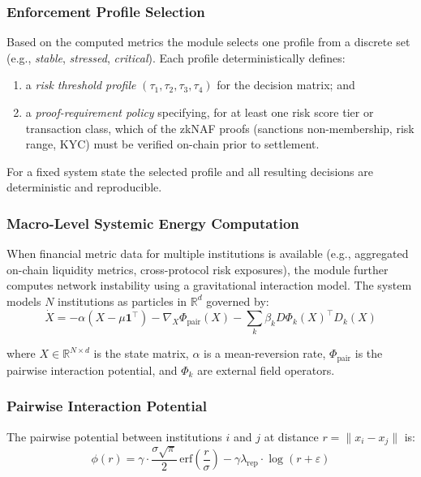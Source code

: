\documentclass[12pt,a4paper]{article}
\begin{document}
\subsubsection{Enforcement Profile Selection}

Based on the computed metrics the module selects one profile from a discrete
set (e.g., \textit{stable}, \textit{stressed}, \textit{critical}). Each
profile deterministically defines:
\begin{enumerate}[label=(\alph*)]
\item a \emph{risk threshold profile} $(\tau_1,\tau_2,\tau_3,\tau_4)$ for
the decision matrix; and
\item a \emph{proof-requirement policy} specifying, for at least one risk
score tier or transaction class, which of the zkNAF proofs (sanctions
non-membership, risk range, KYC) must be verified on-chain prior to
settlement.
\end{enumerate}

For a fixed system state the selected profile and all resulting decisions are
deterministic and reproducible.

\subsubsection{Macro-Level Systemic Energy Computation}

When financial metric data for multiple institutions is available (e.g.,
aggregated on-chain liquidity metrics, cross-protocol risk exposures), the
module further computes network instability using a gravitational interaction
model. The system models $N$ institutions as particles in $\mathbb{R}^d$
governed by:
\begin{equation}
\dot{X} = -\alpha(X-\mu\mathbf{1}^\top) - \nabla_X\Phi_{\text{pair}}(X)
- \sum_k \beta_k D\Phi_k(X)^\top D_k(X)
\end{equation}

where $X \in \mathbb{R}^{N\times d}$ is the state matrix, $\alpha$ is a
mean-reversion rate, $\Phi_{\text{pair}}$ is the pairwise interaction
potential, and $\Phi_k$ are external field operators.

\subsubsection{Pairwise Interaction Potential}

The pairwise potential between institutions $i$ and $j$ at distance
$r = \|x_i - x_j\|$ is:
\begin{equation}
\phi(r) = \gamma \cdot \frac{\sigma\sqrt{\pi}}{2}\,
\mathrm{erf}\!\left(\frac{r}{\sigma}\right)
- \gamma\lambda_{\mathrm{rep}} \cdot \log(r+\varepsilon)
\end{equation}
\end{document}
